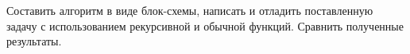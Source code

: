 Составить алгоритм в виде блок-схемы, написать и отладить
поставленную задачу с использованием рекурсивной и обычной функций.
Сравнить полученные результаты.
